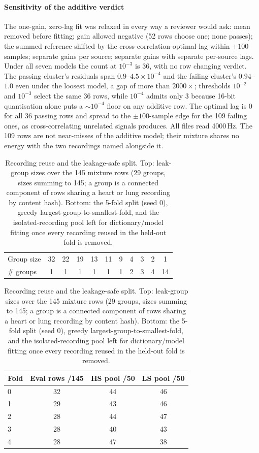\documentclass[conference]{IEEEtran}
\begin{document}
\paragraph{Sensitivity of the additive verdict}
The one-gain, zero-lag fit was relaxed in every way a reviewer would ask: mean removed before fitting; gain allowed negative (52 rows choose one; none passes); the summed reference shifted by the cross-correlation-optimal lag within $\pm100$ samples; separate gains per source; separate gains with separate per-source lags. Under all seven models the count at $10^{-3}$ is 36, with no row changing verdict. The passing cluster's residuals span $0.9$--$4.5\times10^{-4}$ and the failing cluster's $0.94$--$1.0$ even under the loosest model, a gap of more than $2000\times$; thresholds $10^{-2}$ and $10^{-3}$ select the same 36 rows, while $10^{-4}$ admits only 3 because 16-bit quantisation alone puts a $\sim10^{-4}$ floor on any additive row. The optimal lag is 0 for all 36 passing rows and spread to the $\pm100$-sample edge for the 109 failing ones, as cross-correlating unrelated signals produces. All files read 4000\,Hz. The 109 rows are not near-misses of the additive model; their mixture shares no energy with the two recordings named alongside it.

\begin{table}[htbp]
\centering
\caption{Recording reuse and the leakage-safe split. Top: leak-group sizes over the 145 mixture rows (29 groups, sizes summing to 145; a group is a connected component of rows sharing a heart or lung recording by content hash). Bottom: the 5-fold split (seed 0), greedy largest-group-to-smallest-fold, and the isolated-recording pool left for dictionary/model fitting once every recording reused in the held-out fold is removed.}
\label{pi:split}
\footnotesize
\begin{tabular}{@{}lcccccccccc@{}}
\toprule
Group size & 32 & 22 & 19 & 13 & 11 & 9 & 4 & 3 & 2 & 1 \\
\# groups & 1 & 1 & 1 & 1 & 1 & 1 & 2 & 3 & 4 & 14 \\
\bottomrule
\end{tabular}

\vspace{0.6em}
\footnotesize
\begin{tabular}{@{}lccc@{}}
\toprule
Fold & Eval rows /145 & HS pool /50 & LS pool /50 \\
\midrule
0 & 32 & 44 & 46 \\
1 & 29 & 43 & 46 \\
2 & 28 & 44 & 47 \\
3 & 28 & 40 & 43 \\
4 & 28 & 47 & 38 \\
\bottomrule
\end{tabular}
\end{table}
\end{document}
